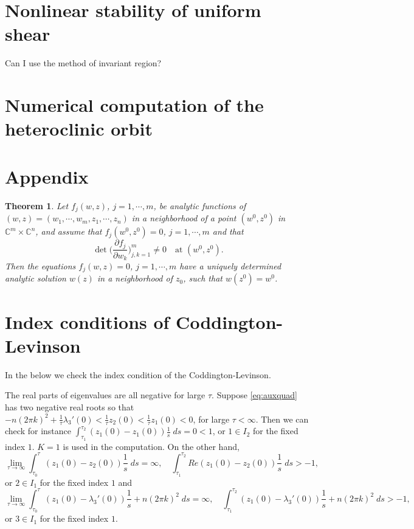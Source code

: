 \documentclass[a4paper,11pt]{article}
\def\blue{\color{blue}}
\newtheorem{theorem}{Theorem}
\theoremstyle{remark}
\begin{document}
\section{Nonlinear stability of uniform shear}
{\blue Can I use the method of invariant region?}
%
%

\section{Numerical computation of the heteroclinic orbit}

\pagebreak
\appendix
\section*{Appendix}
\renewcommand\thetheorem{\Alph{theorem}}
\setcounter{theorem}{\thetmp}



\begin{theorem}{\cite[p. 24]{L1966}} \label{thm:anal} Let $f_j(w,z)$, $j=1,\cdots,m$, be analytic functions of $(w,z)=(w_1,\cdots,w_m,z_1,\cdots,z_n)$ in a neighborhood of a point $(w^0,z^0)$ in $\mathbb{C}^m\times \mathbb{C}^n$, and assume that $f_j(w^0,z^0)=0$, $j=1,\cdots,m$ and that
$$ \det\Big( \frac{\partial f_j}{\partial w_k} \Big)_{j,k=1}^m \ne 0 \quad \text{at $(w^0,z^0)$}.$$
Then the equations $f_j(w,z)=0$, $j=1,\cdots,m$ have a uniquely determined analytic solution $w(z)$ in a neighborhood of $z_0$, such that $w(z^0)=w^0$.
\end{theorem}

\section{Index conditions of Coddington-Levinson} \label{sec:Index}

In the below we check the index condition of the Coddington-Levinson.

 The real parts of eigenvalues are all negative for large $\tau$. Suppose \eqref{eq:auxquad} has two negative real roots so that  $-n(2\pi k)^2 + \frac{1}{\tau}\lambda_3'(0)<\frac{1}{\tau}z_2(0)<\frac{1}{\tau}z_1(0)<0$, for large $\tau<\infty$.  Then we can check for instance
$\displaystyle\int_{\tau_1}^{\tau_2} (z_1(0)-z_1(0))\frac{1}{s} \; ds = 0< 1$,
or $1\in I_2$ for the fixed index $1$. $K=1$ is used in the computation. On the other hand,
$$ \lim_{\tau \rightarrow \infty}\int_{\tau_0}^\tau (z_1(0)-z_2(0))\frac{1}{s} \; ds = \infty, \quad  \int_{\tau_1}^{\tau_2} Re (z_1(0)-z_2(0))\frac{1}{s} \; ds > -1,$$
or $2\in I_1$ for the fixed index $1$ and
$$ \lim_{\tau \rightarrow \infty}\int_{\tau_0}^\tau (z_1(0)-\lambda_3'(0))\frac{1}{s} + n(2\pi k)^2 \; ds =\infty, \quad  \int_{\tau_1}^{\tau_2} (z_1(0)-\lambda_3'(0))\frac{1}{s} + n(2\pi k)^2 \; ds > -1,$$
or $3\in I_1$ for the fixed index $1$.
\end{document}
